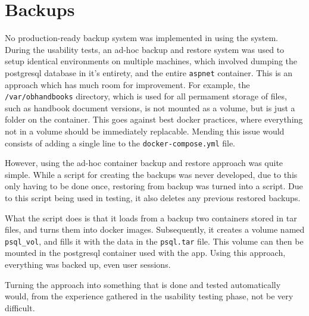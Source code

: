 \section{Backups}
No production-ready backup system was implemented in using the system.
During the usability tests, an ad-hoc backup and restore system was used to setup identical environments on multiple machines, which involved dumping the postgresql database in it's entirety, and the entire \texttt{aspnet} container.
This is an approach which has much room for improvement.
For example, the \texttt{/var/obhandbooks} directory, which is used for all permament storage of files, such as handbook document versions, is not mounted as a volume, but is just a folder on the container.
This goes against best docker practices, where everything not in a volume should be immediately replacable.
Mending this issue would consists of adding a single line to the \texttt{docker-compose.yml} file.

However, using the ad-hoc container backup and restore approach was quite simple.
While a script for creating the backups was never developed, due to this only having to be done once, restoring from backup was turned into a script.
Due to this script being used in testing, it also deletes any previous restored backups.

What the script does is that it loads from a backup two containers stored in tar files, and turns them into docker images.
Subsequently, it creates a volume named \texttt{psql_vol}, and fills it with the data in the \texttt{psql.tar} file.
This volume can then be mounted in the postgresql container used with the app.
Using this approach, everything was backed up, even user sessions.

Turning the approach into something that is done and tested automatically would, from the experience gathered in the usability testing phase, not be very difficult.
